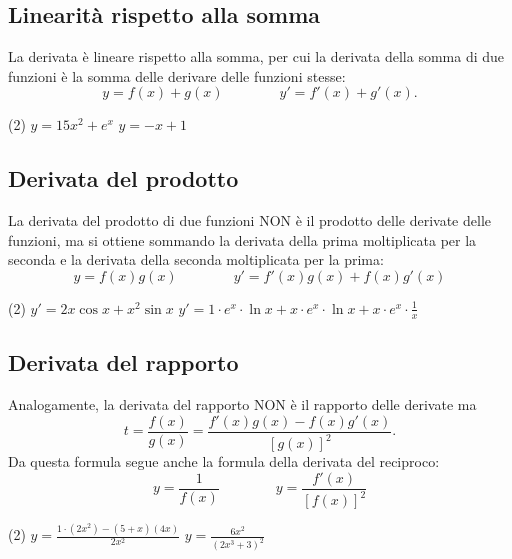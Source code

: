     \subsection{Linearità rispetto alla somma}
    La derivata è lineare rispetto alla somma, per cui la derivata della somma di due funzioni è la somma delle derivare delle funzioni stesse:
    \[y=f(x)+g(x)\qquad \qquad y'=f'(x)+g'(x).\]
    \begin{ex}[
        Calcolare la derivata delle seguenti funzioni
        \begin{tasks}(2)
            \task $y=5x^3+e^x$
            \task $y=-\frac{1}{2}x^2+x+1$
        \end{tasks}
    ]
    \begin{tasks}(2)
        \task $y=15x^2+e^x$
        \task $y=-x+1$
    \end{tasks}
    \end{ex}

    \subsection{Derivata del prodotto}
    La derivata del prodotto di due funzioni NON è il prodotto  delle derivate delle funzioni, ma si ottiene sommando la derivata della prima moltiplicata per la seconda e la derivata della seconda moltiplicata per la prima:
    \[y=f(x)g(x)\qquad\qquad y'=f'(x)g(x)+f(x)g'(x)\]
    \begin{ex}[
        Calcolare la derivata delle seguenti funzioni
        \begin{tasks}(2)
            \task $y=x^2\cdot \cos x$
            \task $y=x\cdot e^x\cdot \ln x$
        \end{tasks}
    ]
    \begin{tasks}(2)
        \task $y'=2x\cos x+ x^2\sin x$
        \task $y'=1\cdot e^x \cdot \ln x+ x\cdot e^x\cdot \ln x+ x\cdot e^x \cdot \frac{1}{x}$
    \end{tasks}
    \end{ex}

    \subsection{Derivata del rapporto}
    Analogamente, la derivata del rapporto NON è il rapporto delle derivate ma 
    \[t=\frac{f(x)}{g(x)}=\frac{f'(x)g(x)-f(x)g'(x)}{[g(x)]^2}.\]
    Da questa formula segue anche la formula della derivata del reciproco:
    \[y=\frac{1}{f(x)}\qquad \qquad y=\frac{f'(x)}{[f(x)]^2}\]
    \begin{ex}[
        Calcolare la derivata delle seguenti funzioni
        \begin{tasks}(2)
            \task $y=\frac{5+x}{2x^2}$
            \task $y=\frac{1}{2x^3+3}$
        \end{tasks}
    ]
    \begin{tasks}(2)
        \task $y=\frac{1\cdot (2x^2)-(5+x)(4x)}{2x^2}$
        \task $y=\frac{6x^2}{(2x^3+3)^2}$
    \end{tasks}
\end{ex}

